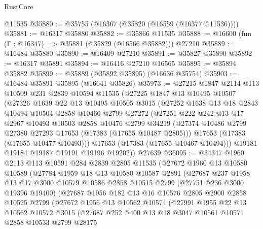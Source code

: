 \begin{lexlean}{RustCore}
\begin{coremodule}
    @11535
@35880 := @35755 (@16367 (@35820 (@16559 (@16377 @11536))))
@35881 := @16317 @35880
@35882 := @35866 @11535
@35888 := @16600 (fun (Γ : @16347) => @35881 (@35829 (@16566 @35882))) @27210
@35889 := @16484 @35880
@35890 := @16409 @27210
@35891 := @35827 @35890
@35892 := @16317 @35891
@35894 := @16416 @27210 @16565
@35895 := @35894 @35882
@35899 := @35889 (@35892 @35895) (@16636 @35754)
@35903 := @16484 @35891 @35895 (@16641 @35826)
@35973 := @27215
    @1847
    @2114
    @113
    @10509
    @231
    @2839
    @10594
    @11535
    (@27225
      @1847
      @13
      @10495
      @10507
      (@27326
        @1639
        @22
        @13
        @10495
        @10505
        @3015
        (@27252
          @1638
          @13
          @18
          @2843
          @10494
          @10504
          @2858
          @10466
          @2799
          @27272
          (@27251
            @222
            @242
            @13
            @17
            @2967
            @10493
            @10503
            @2858
            @10476
            @2799
            @34219
            (@27374 @10486 @2799 @27380 @27293 @17653 (@17383 (@17655 @10487 @2805)))
            @17653
            (@17383 (@17655 @10477 @10493)))
          @17653
          (@17383 (@17655 @10467 @10494)))
        @19181
        @19184
        @19187
        @19191
        @19196
        @19202))
    @27639
@36095 := @34347
    @1960
    @2113
    @113
    @10591
    @284
    @2839
    @2805
    @11535
    (@27672
      @1960
      @13
      @10580
      @10589
      (@27784
        @1959
        @18
        @13
        @10580
        @10587
        @2891
        (@27687
          @237
          @1958
          @13
          @17
          @3000
          @10579
          @10586
          @2858
          @10515
          @2799
          (@27751 @236 @3000 @19396 @19400)
          (@27687
            @1956
            @182
            @13
            @16
            @10576
            @2805
            @2900
            @2858
            @10525
            @2799
            (@27672
              @1956
              @13
              @10562
              @10574
              (@27991
                @1955
                @22
                @13
                @10562
                @10572
                @3015
                (@27687
                  @252
                  @400
                  @13
                  @18
                  @3047
                  @10561
                  @10571
                  @2858
                  @10533
                  @2799
                  @28175

\end{coremodule}
\end{lexlean}
